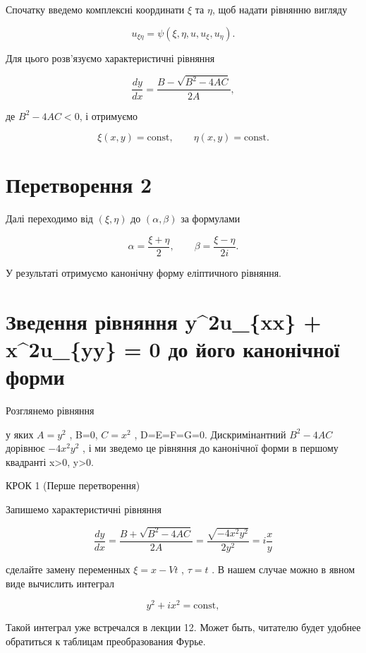 \documentclass[
  ukrainian,
]{article}
\begin{document}
Спочатку введемо комплексні координати \(\xi\) та \(\eta\), щоб надати
рівнянню вигляду

\[
u_{\xi\eta} = \psi(\xi, \eta, u, u_{\xi}, u_{\eta}).
\]

Для цього розв'язуємо характеристичні рівняння

\[
\frac{dy}{dx} = \frac{B - \sqrt{B^2 - 4AC}}{2A},
\]

де \(B^2 - 4AC < 0\), і отримуємо

\[
\xi(x, y) = \text{const}, \qquad \eta(x, y) = \text{const}.
\]

\section{Перетворення
2}\label{ux43fux435ux440ux435ux442ux432ux43eux440ux435ux43dux43dux44f-2}

Далі переходимо від \((\xi,\eta)\) до \((\alpha,\beta)\) за формулами

\[
\alpha = \frac{\xi + \eta}{2}, \qquad \beta = \frac{\xi - \eta}{2i}.
\]

У результаті отримуємо канонічну форму еліптичного рівняння.

\section{Зведення рівняння y\^{}2u\_\{xx\} + x\^{}2u\_\{yy\} = 0 до його
канонічної
форми}\label{ux437ux432ux435ux434ux435ux43dux43dux44f-ux440ux456ux432ux43dux44fux43dux43dux44f-y2u_xx-x2u_yy-0-ux434ux43e-ux439ux43eux433ux43e-ux43aux430ux43dux43eux43dux456ux447ux43dux43eux457-ux444ux43eux440ux43cux438}

Розглянемо рівняння

у яких \(A=y^2\) , B=0, \(C=x^2\) , D=E=F=G=0. Дискримінантний
\(B^2-4AC\) дорівнює \(-4x^2y^2\) , і ми зведемо це рівняння до
канонічної форми в першому квадранті x\textgreater0, y\textgreater0.

КРОК 1 (Перше перетворення)

Запишемо характеристичні рівняння

\[
\frac{dy}{dx} = \frac{B + \sqrt{B^2 - 4AC}}{2A} = \frac{\sqrt{-4x^2y^2}}{2y^2} = i\frac{x}{y}
\]

сделайте замену переменных \(\xi = x - Vt\) , \(\tau = t\) . В нашем
случае можно в явном виде вычислить интеграл

\[
y^2 + ix^2 = \text{const},
\]

Такой интеграл уже встречался в лекции 12. Может быть, читателю будет
удобнее обратиться к таблицам преобразования Фурье.
\end{document}
